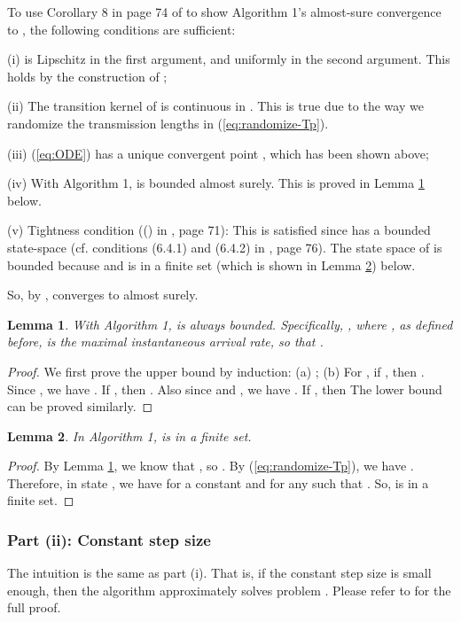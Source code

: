 \documentclass{IEEEtran}
\newtheorem{lemma}{Lemma}
\begin{document}
To use Corollary 8 in page 74 of \cite{Borkar} to show Algorithm
1's almost-sure convergence to , the following conditions
are sufficient: 

(i)  is Lipschitz in the first argument, and uniformly
in the second argument. This holds by the construction of ; 

(ii) The transition kernel of  is continuous in .
This is true due to the way we randomize the transmission lengths
in (\ref{eq:randomize-Tp}).

(iii) (\ref{eq:ODE}) has a unique convergent point ,
which has been shown above; 

(iv) With Algorithm 1,  is bounded  almost
surely. This is proved in Lemma \ref{lem:r-bounded-Algorithm-4} below.

(v) Tightness condition ((\dag{}) in \cite{Borkar}, page 71): This
is satisfied since  has a bounded state-space (cf. conditions
(6.4.1) and (6.4.2) in \cite{Borkar}, page 76). The state space of
 is bounded because  and  is
in a finite set (which is shown in Lemma \ref{lem:finite-set}) below.

So, by \cite{Borkar},  converges to  almost
surely.
\begin{lemma}
\label{lem:r-bounded-Algorithm-4}With Algorithm 1, 
is always bounded. Specifically, ,
where , as defined before, is the maximal instantaneous
arrival rate, so that . \end{lemma}
\begin{proof}
We first prove the upper bound  by induction:
(a) ; (b) For ,
if ,
then . Since ,
we have . If ,
then . Also since 
and , we have .
If , then 
The lower bound  can be proved similarly. \end{proof}
\begin{lemma}
\label{lem:finite-set}In Algorithm 1,  is in a finite
set.\end{lemma}
\begin{proof}
By Lemma \ref{lem:r-bounded-Algorithm-4}, we know that ,
so .
By (\ref{eq:randomize-Tp}), we have .
Therefore, in state ,
we have  for a constant  and 
for any  such that . So,  is in a finite
set.
\end{proof}

\subsubsection{Part (ii): Constant step size}

The intuition is the same as part (i). That is, if the constant step
size is small enough, then the algorithm approximately solves problem
. Please refer to \cite{longer_version}
for the full proof.
\end{document}

